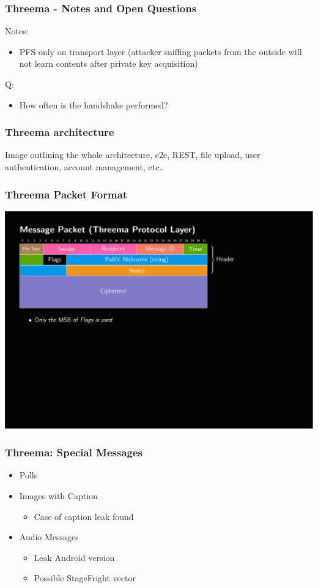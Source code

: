 \documentclass[
	aspectratio=169,
	xetex,
]{beamer}
\begin{document}
\begin{frame}
	\frametitle{Threema - Notes and Open Questions}
	Notes:
	\begin{itemize}
		\item PFS only on transport layer (attacker sniffing packets from the outside will not learn contents after private key acquisition)
	\end{itemize}
	Q:
	\begin{itemize}
		\item How often is the handshake performed?
	\end{itemize}
\end{frame}

\begin{frame}
	\frametitle{Threema architecture}
	Image outlining the whole architecture, e2e, REST, file upload, user authentication, account management, etc..
\end{frame}

\begin{frame}
	\frametitle{Threema Packet Format}

	\includegraphics[page=1,clip,trim={.99cm 8cm 3.2cm 1.8cm},width=\textwidth]{out/messages.pdf}

\end{frame}

\begin{frame}
	\frametitle{Threema: Special Messages}
	\begin{itemize}
		\item Polls
		\item Images with Caption
			\begin{itemize}
				\item Case of caption leak found
			\end{itemize}
		\item Audio Messages
			\begin{itemize}
				\item Leak Android version
				\item Possible StageFright vector
			\end{itemize}
	\end{itemize}
\end{frame}
\end{document}
